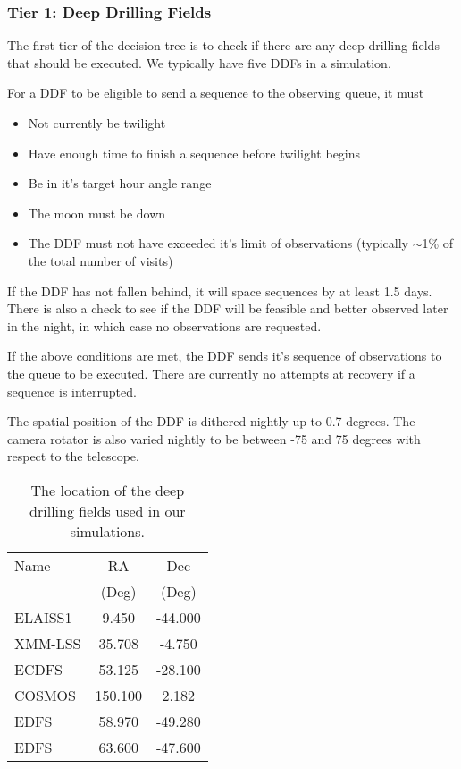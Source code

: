 \subsubsection{Tier 1:  Deep Drilling Fields}

The first tier of the decision tree is to check if there are any deep drilling fields that should be executed. We typically have five DDFs in a simulation. 

For a DDF to be eligible to send a sequence to the observing queue, it must
\begin{itemize}
\item{Not currently be twilight}
\item{Have enough time to finish a sequence before twilight begins}
\item{Be in it's target hour angle range}
\item{The moon must be down}
\item{The DDF must not have exceeded it's limit of observations (typically $\sim$1\% of the total number of visits)}
\end{itemize}

If the DDF has not fallen behind, it will space sequences by at least 1.5 days. There is also a check to see if the DDF will be feasible and better observed later in the night, in which case no observations are requested.

If the above conditions are met, the DDF sends it's sequence of observations to the queue to be executed. There are currently no attempts at recovery if a sequence is interrupted. 

The spatial position of the DDF is dithered nightly up to 0.7 degrees.  The camera rotator is also varied nightly to be between -75 and 75 degrees with respect to the telescope. 

\begin{table}
\begin{tabular}{lcc}
\toprule
    Name &      RA &     Dec \\
    &          (Deg) &  (Deg) \\
    \hline
 ELAISS1 &   9.450 & -44.000 \\
 XMM-LSS &  35.708 &  -4.750 \\
   ECDFS &  53.125 & -28.100 \\
  COSMOS & 150.100 &   2.182 \\
    EDFS &  58.970 & -49.280 \\
    EDFS &  63.600 & -47.600 \\
    \hline
\end{tabular}
\caption{The location of the deep drilling fields used in our simulations.}\label{table:ddfs}
\end{table}



